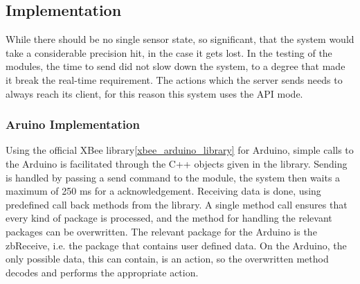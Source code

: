 \subsection{Implementation}
While there should be no single sensor state, so significant, that the system would take a considerable precision hit, in the case it gets lost. In the testing of the modules, the time to send did not slow down the system, to a degree that made it break the real-time requirement. The actions which the server sends needs to always reach its client, for this reason this system uses the API mode.
\subsubsection{Aruino Implementation}
Using the official XBee library\cref{xbee_arduino_library} for Arduino, simple calls to the Arduino is facilitated through the C++ objects given in the library. Sending is handled by passing a send command  to the module, the system then waits a maximum of 250 ms for a acknowledgement.
Receiving data is done, using predefined call back methods from the library. A single method call ensures that every kind of package is processed, and the method for handling the relevant packages can be overwritten. The relevant package for the Arduino is the zbReceive, i.e. the package that contains user defined data. On the Arduino, the only possible data, this can contain, is an action, so the overwritten method decodes and performs the appropriate action.
